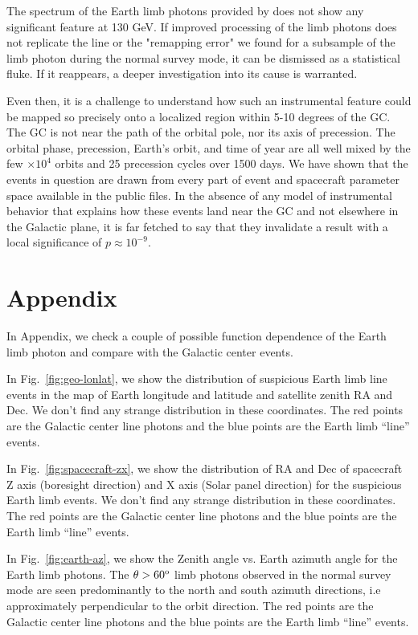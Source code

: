 \documentclass[aps,twocolumn,prd,superscriptaddress,showpacs,nofootinbib,fixfloat]{revtex4}
\newcommand{\degree}{^{\rm o}}
\begin{document}
The spectrum of the Earth limb photons provided by
\citep{FermiLimb} does not show any significant feature at
130 GeV. If improved processing of the limb photons does not
replicate the line or the "remapping error" we found for a
subsample of the limb photon during the normal survey mode,
it can be dismissed as a statistical fluke.  If it
reappears, a deeper investigation into its cause is
warranted.

Even then, it is a challenge to understand how such an
instrumental feature could be mapped so precisely onto a
localized region within 5-10 degrees of the GC.  The GC is
not near the path of the orbital pole, nor its axis of
precession.  The orbital phase, precession, Earth's orbit,
and time of year are all well mixed by the few $\times10^4$
orbits and 25 precession cycles over 1500 days.  We have
shown that the events in question are drawn from every part
of event and spacecraft parameter space available in the
public files.  In the absence of any model of instrumental
behavior that explains how these events land near the GC and
not elsewhere in the Galactic plane, it is far fetched to
say that they invalidate a result with a local significance
of $p\approx10^{-9}$.


\section{Appendix}

In Appendix, we check a couple of possible function
dependence of the Earth limb photon and compare with the
Galactic center events. 

In Fig.~\ref{fig:geo-lonlat}, we show the distribution of
suspicious Earth limb line events in the map of Earth
longitude and latitude and satellite zenith RA and Dec. We
don't find any strange distribution in these
coordinates. The red points are the Galactic center line
photons and the blue points are the Earth limb ``line''
events.

In Fig.~\ref{fig:spacecraft-zx}, we show the distribution of
RA and Dec of spacecraft Z axis (boresight direction) and X
axis (Solar panel direction) for the suspicious Earth limb
events. We don't find any strange distribution in these
coordinates. The red points are the Galactic center line
photons and the blue points are the Earth limb ``line''
events.

In Fig.~\ref{fig:earth-az}, we show the Zenith angle
vs. Earth azimuth angle for the Earth limb photons. The
$\theta > 60\degree$ limb photons observed in the normal
survey mode are seen predominantly to the north and south
azimuth directions, i.e approximately perpendicular to the
orbit direction. The red points are the Galactic center line
photons and the blue points are the Earth limb ``line''
events.
\end{document}
